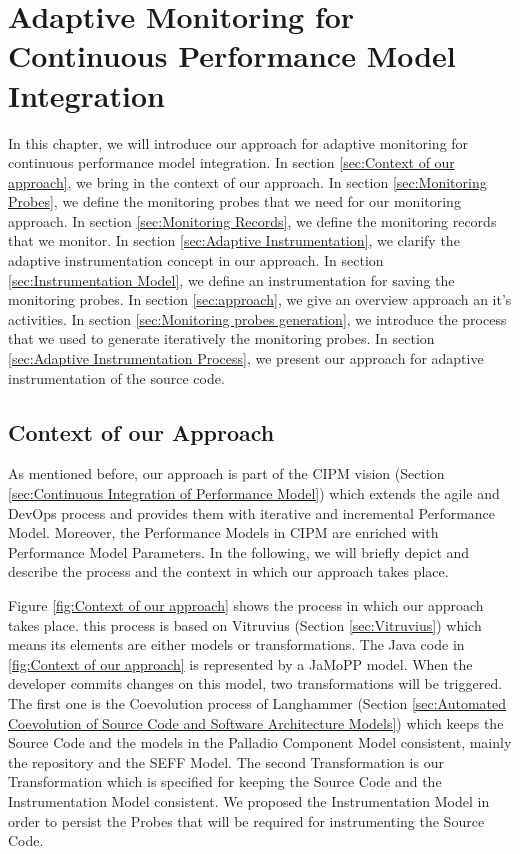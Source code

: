 

\chapter{Adaptive Monitoring for Continuous Performance Model Integration}
\label{ch:Adaptive Monitoring for Continuous Performance Model Integration}
In this chapter, we will introduce our approach for adaptive monitoring for continuous performance model integration. In section \ref{sec:Context of our approach}, we bring in the context of our approach. In section \ref{sec:Monitoring Probes}, we define the monitoring probes that we need for our monitoring approach. In section \ref{sec:Monitoring Records}, we define the monitoring records that we monitor. In section \ref{sec:Adaptive Instrumentation}, we clarify the adaptive instrumentation concept in our approach. In section \ref{sec:Instrumentation Model}, we define an instrumentation for saving the monitoring probes. In section \ref{sec:approach}, we give an overview approach an it's activities. In section \ref{sec:Monitoring probes generation}, we introduce the process that we used to generate iteratively the monitoring probes. In section \ref{sec:Adaptive Instrumentation Process}, we present our approach for adaptive instrumentation of the source code. 

\section{Context of our Approach}
\label{sec:Context of our Approach}
As mentioned before, our approach is part of the CIPM vision (Section \ref{sec:Continuous Integration of Performance Model}) which extends the agile and DevOps process and provides them with iterative and incremental Performance Model. Moreover, the Performance Models in CIPM are enriched with Performance Model Parameters. In the following, we will briefly depict and describe the process and the context in which our approach takes place.

Figure \ref{fig:Context of our approach} shows the process in which our approach takes place. this process is based on Vitruvius (Section \ref{sec:Vitruvius}) which means its elements are either models or transformations. The Java code in \ref{fig:Context of our approach} is represented by a JaMoPP model. When the developer commits changes on this model, two transformations will be triggered. The first one is the Coevolution process of Langhammer (Section \ref{sec:Automated Coevolution of Source Code and Software Architecture Models}) which keeps the Source Code and the models in the Palladio Component Model consistent, mainly the repository and the SEFF Model. The second Transformation is our Transformation which is specified for keeping the Source Code and the Instrumentation Model consistent. We proposed the Instrumentation Model in order to persist the Probes that will be required for instrumenting the Source Code.

